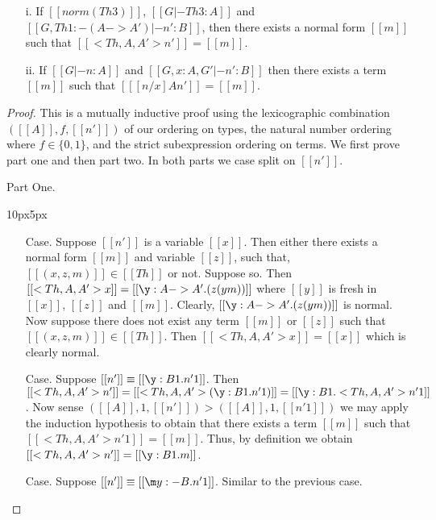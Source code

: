 \begin{lemma}
  \label{lemma:normality_preservation}
  \begin{itemize}
  \item[i.] If $[[norm (Th 3)]]$, $[[G |- Th 3 : A]]$ and $[[G, Th 1:{-(A->A')} |- n' : B]]$, 
    then there exists a normal form $[[m]]$ such that $[[<Th,A,A'>n']] = [[m]]$.
    
  \item[ii.] If $[[G |- n:A]]$ and $[[G, x:A, G' |- n':B]]$ then there exists a term $[[m]]$ 
    such that $[[ [n/x] A n']] = [[m]]$. 
  \end{itemize} 
\end{lemma}
\begin{proof}
  This is a mutually inductive proof using the lexicographic combination\\
  $([[A]], f,[[n']])$ of our ordering on types,
  the natural number ordering where $f \in \{0,1\}$, and
  the strict subexpression ordering on terms. We first prove part one
  and then part two.  In both parts we case split on $[[n']]$.
  
  \noindent Part One.
  \vspace{-25px}
  \begin{changemargin}{10px}{5px}\noindent
  \begin{itemize}
  \item[Case.] Suppose $[[n']]$ is a variable $[[x]]$.  Then either there exists
    a normal form $[[m]]$ and variable $[[z]]$, such that, $[[(x,z,m)]] \in [[Th]]$ or not.  
    Suppose so. Then 
    $[[<Th,A,A'>x]] = [[\y:A->A'.(z (y m))]]$ where $[[y]]$ is fresh in $[[x]]$, $[[z]]$ and 
    $[[m]]$.  Clearly, $[[\y:A->A'.(z (y m))]]$ is normal.
    Now suppose there does not exist any term $[[m]]$ or $[[z]]$ such that 
    $[[(x,z,m)]] \in [[Th]]$.  Then $[[<Th,A,A'>x]] = [[x]]$ which is clearly normal.

  \item[Case.] Suppose $[[n']] \equiv [[\y:B1.n'1]]$.  Then 
    $[[<Th,A,A'>n']] = [[<Th ,A,A'>(\y:B1.n'1)]] = [[\y:B1.<Th,A,A'>n'1]]$.  Now sense
    $([[A]],1,[[n']]) > ([[A]],1,[[n'1]])$ we may apply the induction hypothesis to obtain
    that there exists a term $[[m]]$ such that $[[<Th,A,A'>n'1]] = [[m]]$.  
    Thus, by definition we obtain $[[<Th,A,A'>n']] = [[\y:B1.m]]$.

  \item[Case.] Suppose $[[n']] \equiv [[\m y:{-B}.n'1]]$. Similar to the previous case.


\end{itemize}
\end{changemargin}
\end{proof}
